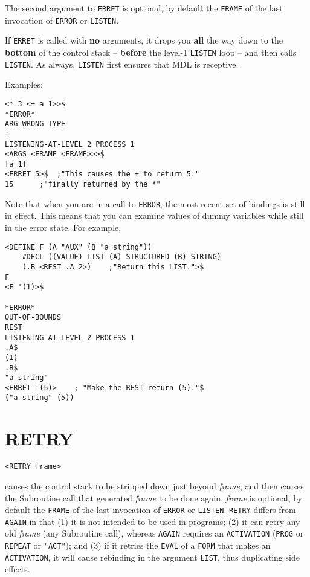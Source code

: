 \documentclass[a4paper]{scrbook}
\begin{document}
The second argument to \texttt{ERRET} is optional, by default the \texttt{FRAME} of the last invocation of \texttt{ERROR}
or \texttt{LISTEN}.

If \texttt{ERRET} is called with \textbf{no} arguments, it drops you \textbf{all} the way down to the \textbf{bottom} of
the control stack -- \textbf{before} the level-1 \texttt{LISTEN} loop -- and then calls \texttt{LISTEN}. As always,
\texttt{LISTEN} first ensures that MDL is receptive.

Examples:

\begin{verbatim}
<* 3 <+ a 1>>$
*ERROR*
ARG-WRONG-TYPE
+
LISTENING-AT-LEVEL 2 PROCESS 1
<ARGS <FRAME <FRAME>>>$
[a 1]
<ERRET 5>$  ;"This causes the + to return 5."
15      ;"finally returned by the *"
\end{verbatim}

Note that when you are in a call to \texttt{ERROR}, the most recent set of bindings is still in effect. This means that you
can examine values of dummy variables while still in the error state. For example,

\begin{verbatim}
<DEFINE F (A "AUX" (B "a string"))
    #DECL ((VALUE) LIST (A) STRUCTURED (B) STRING)
    (.B <REST .A 2>)    ;"Return this LIST.">$
F
<F '(1)>$

*ERROR*
OUT-OF-BOUNDS
REST
LISTENING-AT-LEVEL 2 PROCESS 1
.A$
(1)
.B$
"a string"
<ERRET '(5)>    ; "Make the REST return (5)."$
("a string" (5))
\end{verbatim}

\section{RETRY}\label{retry}

\begin{verbatim}
<RETRY frame>
\end{verbatim}

 causes the control stack to be stripped down just beyond \emph{frame}, and then causes the
Subroutine call that generated \emph{frame} to be done again. \emph{frame} is optional, by default the \texttt{FRAME} of
the last invocation of \texttt{ERROR} or \texttt{LISTEN}. \texttt{RETRY} differs from \texttt{AGAIN} 
in that (1) it is not intended to be used in programs; (2) it can retry any old \emph{frame} (any Subroutine call), whereas
\texttt{AGAIN} requires an \texttt{ACTIVATION}  (\texttt{PROG} or \texttt{REPEAT} or
\texttt{"ACT"}); and (3) if it retries the \texttt{EVAL} of a \texttt{FORM} that makes an \texttt{ACTIVATION}, it will
cause rebinding in the argument \texttt{LIST}, thus duplicating side effects.
\end{document}
